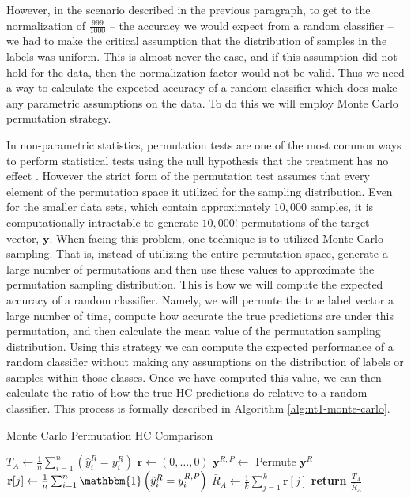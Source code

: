 \documentclass[../thesis.tex]{subfiles}
\begin{document}
However, in the scenario described in the previous paragraph, to get to the normalization of $\frac{999}{1000}$ -- the accuracy we would expect from a random classifier -- we had to make the critical assumption that the distribution of samples in the labels was uniform. This is almost never the case, and if this assumption did not hold for the data, then the normalization factor would not be valid. Thus we need a way to calculate the expected accuracy of a random classifier which does make any parametric assumptions on the data. To do this we will employ Monte Carlo permutation strategy.

In non-parametric statistics, permutation tests are one of the most common ways to perform statistical tests using the null hypothesis that the treatment has no effect \cite{good2013permutation}. However the strict form of the permutation test assumes that every element of the permutation space it utilized for the sampling distribution. Even for the smaller data sets, which contain approximately $10,000$ samples, it is computationally intractable to generate $10,000!$ permutations of the target vector, $\mathbf{y}$. When facing this problem, one technique is to utilized Monte Carlo sampling. That is, instead of utilizing the entire permutation space, generate a large number of permutations and then use these values to approximate the permutation sampling distribution.  This is how we will compute the expected accuracy of a random classifier. Namely, we will permute the true label vector a large number of time, compute how accurate the true predictions are under this permutation, and then calculate the mean value of the permutation sampling distribution. Using this strategy we can compute the expected performance of a random classifier without making any assumptions on the distribution of labels or samples within those classes. Once we have computed this value, we can then calculate the ratio of how the true HC predictions do relative to a random classifier. This process is formally described in Algorithm \ref{alg:nt1-monte-carlo}.

\begin{algorithm}
    \caption{Monte Carlo Permutation HC Comparison}
    \label{alg:nt1-monte-carlo}
    \begin{algorithmic}[1]
            \State $T_A \gets \frac{1}{n} \sum_{i=1}^n \left(\hat{y}_i^R = y_i^R \right)$
            \State $\mathbf{r} \gets (0, \ldots, 0)$ 
                \State $\mathbf{y}^{R, P} \gets $ Permute $\mathbf{y}^R$
                \State $\mathbf{r}[j] \gets \frac{1}{n} \sum_{i=1}^n \mathbbm{1}\left(\hat{y}_i^R = y_i^{R,P}\right)$
            \EndFor
            \State $\bar{R}_A \gets \frac{1}{k} \sum_{j=1}^k \mathbf{r}[j]$
            \State \textbf{return} $\frac{T_A}{\bar{R}_A}$
        \EndProcedure
    \end{algorithmic}
\end{algorithm}
\end{document}
